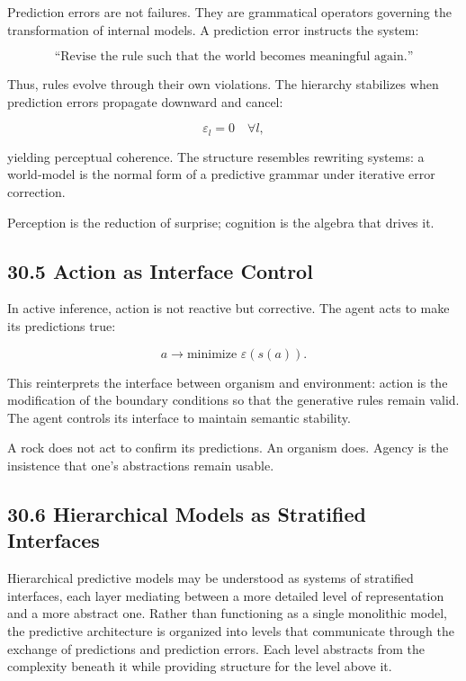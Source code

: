 \documentclass[12pt,letterpaper]{article}
\theoremstyle{remark}
\begin{document}
Prediction errors are not failures. They are grammatical operators governing the transformation of internal models.  
A prediction error instructs the system:

\[
\text{“Revise the rule such that the world becomes meaningful again.”}
\]

Thus, rules evolve through their own violations.  
The hierarchy stabilizes when prediction errors propagate downward and cancel:

\[
\varepsilon_l = 0 \quad \forall l,
\]

yielding perceptual coherence.  
The structure resembles rewriting systems: a world-model is the normal form of a predictive grammar under iterative error correction.

Perception is the reduction of surprise; cognition is the algebra that drives it.

\subsection{30.5 Action as Interface Control}

In active inference, action is not reactive but corrective. The agent acts to make its predictions true:

\[
a \to \text{minimize } \varepsilon(s(a)).
\]

This reinterprets the interface between organism and environment:  
action is the modification of the boundary conditions so that the generative rules remain valid.  
The agent controls its interface to maintain semantic stability.

A rock does not act to confirm its predictions.  
An organism does.  
Agency is the insistence that one’s abstractions remain usable.

\subsection{30.6 Hierarchical Models as Stratified Interfaces}

Hierarchical predictive models may be understood as systems of stratified interfaces, each layer mediating between a more detailed level of representation and a more abstract one. Rather than functioning as a single monolithic model, the predictive architecture is organized into levels that communicate through the exchange of predictions and prediction errors. Each level abstracts from the complexity beneath it while providing structure for the level above it.
\end{document}
